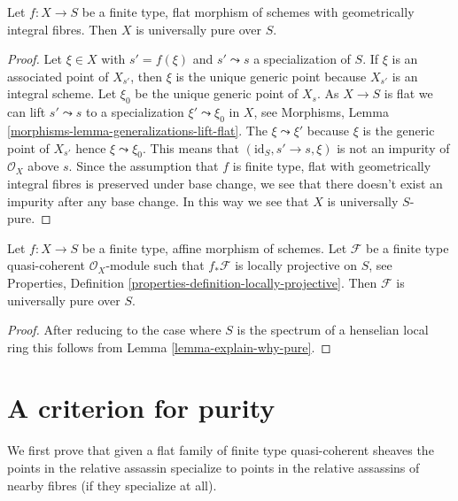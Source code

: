 \begin{lemma}
\label{lemma-flat-geometrically-integral-fibres-pure}
Let $f : X \to S$ be a finite type, flat morphism of schemes
with geometrically integral fibres. Then $X$ is universally pure
over $S$.
\end{lemma}

\begin{proof}
Let $\xi \in X$ with $s' = f(\xi)$ and $s' \leadsto s$ a specialization
of $S$. If $\xi$ is an associated point of $X_{s'}$, then $\xi$ is the
unique generic point because $X_{s'}$ is an integral scheme. Let
$\xi_0$ be the unique generic point of $X_s$. As $X \to S$ is flat
we can lift $s' \leadsto s$ to a specialization
$\xi' \leadsto \xi_0$ in $X$, see
Morphisms, Lemma \ref{morphisms-lemma-generalizations-lift-flat}.
The $\xi \leadsto \xi'$ because $\xi$ is the generic point of $X_{s'}$
hence $\xi \leadsto \xi_0$. This means that $(\text{id}_S, s' \to s, \xi)$
is not an impurity of $\mathcal{O}_X$ above $s$. Since the assumption
that $f$ is finite type, flat with geometrically integral fibres
is preserved under base change, we see that there doesn't exist an
impurity after any base change. In this way we see that $X$ is
universally $S$-pure.
\end{proof}

\begin{lemma}
\label{lemma-affine-locally-projective-pure}
Let $f : X \to S$ be a finite type, affine morphism of schemes.
Let $\mathcal{F}$ be a finite type quasi-coherent $\mathcal{O}_X$-module
such that $f_*\mathcal{F}$ is locally projective on $S$, see
Properties, Definition \ref{properties-definition-locally-projective}.
Then $\mathcal{F}$ is universally pure over $S$.
\end{lemma}

\begin{proof}
After reducing to the case where $S$ is the spectrum of a henselian
local ring this follows from
Lemma \ref{lemma-explain-why-pure}.
\end{proof}




\section{A criterion for purity}
\label{section-criterion-purity}

\noindent
We first prove that given a flat family of finite type
quasi-coherent sheaves the points in the relative assassin
specialize to points in the relative assassins of nearby fibres
(if they specialize at all).

